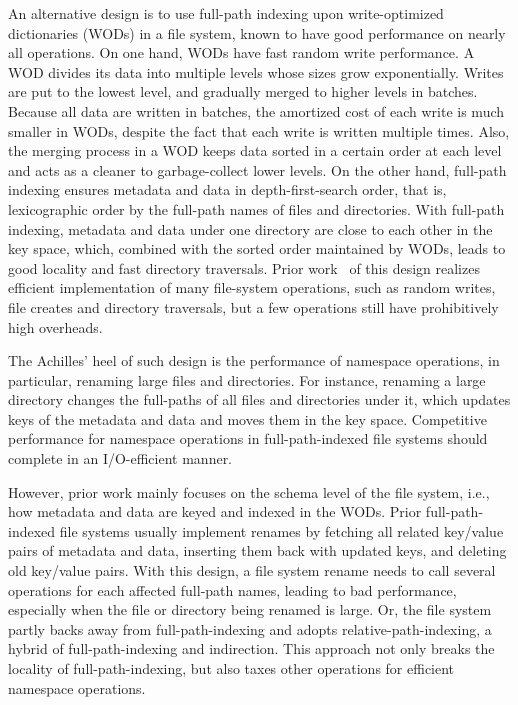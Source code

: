 An alternative design is to use full-path indexing upon write-optimized
dictionaries (WODs) in a file system, known to have good performance on nearly
all operations.
On one hand, WODs have fast random write performance.
A WOD divides its data into multiple levels whose sizes grow exponentially.
Writes are put to the lowest level, and gradually merged to higher levels in
batches.
Because all data are written in batches, the amortized cost of each write is
much smaller in WODs,
despite the fact that each write is written multiple times.
Also, the merging process in a WOD keeps data sorted in a certain order at each
level and acts as a cleaner to garbage-collect lower levels.
On the other hand, full-path indexing ensures metadata and data in
depth-first-search order, that is, lexicographic order by the full-path names
of files and directories.
With full-path indexing, metadata and data under one directory are close to each
other in the key space, which, combined with the sorted order maintained by
WODs, leads to good locality and fast directory traversals.
Prior work~\citep{betrfs1,betrfs1tos,betrfs2,betrfs2tos,betrfs3} of this design
realizes efficient implementation of many file-system operations, such as random
writes, file creates and directory traversals,
but a few operations still have prohibitively high overheads.

The Achilles' heel of such design is the performance of namespace operations,
in particular, renaming large files and directories.
For instance, renaming a large directory changes the full-paths of all files
and directories under it, which updates keys of the metadata and
data and moves them in the key space.
Competitive performance for namespace operations in full-path-indexed file
systems should complete in an I/O-efficient manner.

However, prior work mainly focuses on the schema level of the file system, i.e.,
how metadata and data are keyed and indexed in the WODs.
Prior full-path-indexed file systems usually implement renames by
fetching all related key/value pairs of metadata and data,
inserting them back with updated keys, and deleting old key/value pairs.
With this design, a file system rename needs to call several operations for each
affected full-path names, leading to bad performance,
especially when the file or directory being renamed is large.
Or, the file system partly backs away from full-path-indexing and adopts
relative-path-indexing, a hybrid of full-path-indexing and indirection.
This approach not only breaks the locality of full-path-indexing, but also
taxes other operations for efficient namespace operations.

